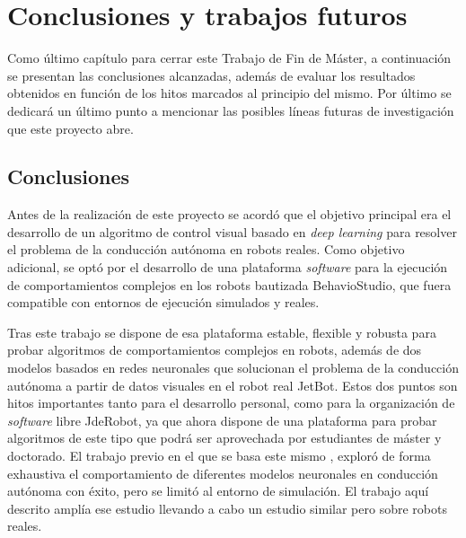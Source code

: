 \chapter{Conclusiones y trabajos futuros}

Como último capítulo para cerrar este Trabajo de Fin de Máster, a continuación se presentan las conclusiones alcanzadas, además de evaluar los resultados obtenidos en función de los hitos marcados al principio del mismo. Por último se dedicará un último punto a mencionar las posibles líneas futuras de investigación que este proyecto abre.

\section{Conclusiones}

Antes de la realización de este proyecto se acordó que el objetivo principal era el desarrollo de un algoritmo de control visual basado en \textit{deep learning} para resolver el problema de la conducción autónoma en robots reales. Como objetivo adicional, se optó por el desarrollo de una plataforma \textit{software} para la ejecución de comportamientos complejos en los robots bautizada BehavioStudio, que fuera compatible con entornos de ejecución simulados y reales.

Tras este trabajo se dispone de esa plataforma estable, flexible y robusta para probar algoritmos de comportamientos complejos en robots, además de dos modelos basados en redes neuronales que solucionan el problema de la conducción autónoma a partir de datos visuales en el robot real JetBot. Estos dos puntos son hitos importantes tanto para el desarrollo personal, como para la organización de \textit{software} libre JdeRobot, ya que ahora dispone de una plataforma para probar algoritmos de este tipo que podrá ser aprovechada por estudiantes de máster y doctorado. El trabajo previo en el que se basa este mismo \cite{vanessa}, exploró de forma exhaustiva el comportamiento de diferentes modelos neuronales en conducción autónoma con éxito, pero se limitó al entorno de simulación. El trabajo aquí descrito amplía ese estudio llevando a cabo un estudio similar pero sobre robots reales.

